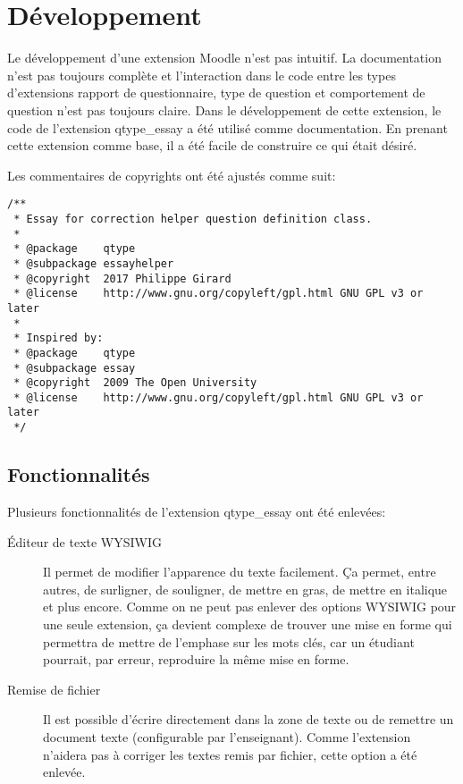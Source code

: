 \chapter{Développement}

Le développement d'une extension Moodle n'est pas intuitif.
La documentation n'est pas toujours complète et l'interaction dans le code entre les types d'extensions rapport de questionnaire, type de question et comportement de question n'est pas toujours claire.
Dans le développement de cette extension, le code de l'extension \og qtype\_essay \fg{} a été utilisé comme documentation.
En prenant cette extension comme base, il a été facile de construire ce qui était désiré.

Les commentaires de copyrights ont été ajustés comme suit:

\begin{lstlisting}[frame=l]
/**
 * Essay for correction helper question definition class.
 *
 * @package    qtype
 * @subpackage essayhelper
 * @copyright  2017 Philippe Girard
 * @license    http://www.gnu.org/copyleft/gpl.html GNU GPL v3 or later
 *
 * Inspired by:
 * @package    qtype
 * @subpackage essay
 * @copyright  2009 The Open University
 * @license    http://www.gnu.org/copyleft/gpl.html GNU GPL v3 or later
 */
\end{lstlisting}

\section{Fonctionnalités}

Plusieurs fonctionnalités de l'extension \og qtype\_essay \fg{} ont été enlevées:

\begin{description}
  \item[Éditeur de texte WYSIWIG]
  
  Il permet de modifier l'apparence du texte facilement.
  Ça permet, entre autres, de surligner, de souligner, de mettre en gras, de mettre en italique et plus encore.
  Comme on ne peut pas enlever des options WYSIWIG pour une seule extension, ça devient complexe de trouver une mise en forme qui permettra de mettre de l'emphase sur les mots clés, car un étudiant pourrait, par erreur, reproduire la même mise en forme.
  
  \item[Remise de fichier]
  
  Il est possible d'écrire directement dans la zone de texte ou de remettre un document texte (configurable par l'enseignant).
  Comme l'extension n'aidera pas à corriger les textes remis par fichier, cette option a été enlevée.
\end{description}

